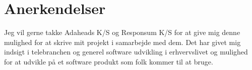 \chapter*{Anerkendelser}

Jeg vil gerne takke Adaheads K/S og Responsum K/S for at give mig denne mulighed for at skrive mit projekt i samarbejde med dem. Det har givet mig indsigt i telebranchen og generel software udvikling i erhvervslivet og mulighed for at udvikle på et software produkt som folk kommer til at bruge.
